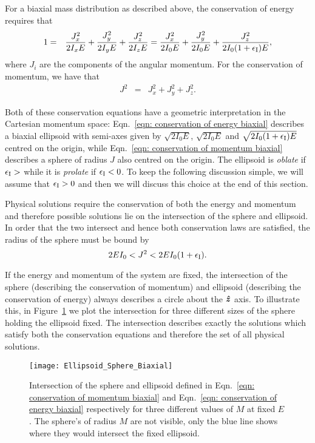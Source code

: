 \documentclass[../full_thesis/full_thesis.tex]{subfiles}
\begin{document}
For a biaxial mass distribution as described above, the conservation of energy
requires that
\begin{eqnarray}
1 & = & \frac{J_{x}^{2}}{2I_{x}E}+\frac{J_{y}^{2}}{2I_{y}E}+\frac{J_{z}^{2}}{2I_{z}E}
=\frac{J_{x}^{2}}{2I_{0}E}+\frac{J_{y}^{2}}{2I_{0}E}+\frac{J_{z}^{2}}{2I_{0}(1+\epsilon_{\mathrm{I}})E},
\label{eqn: conservation of energy biaxial}
\end{eqnarray}
where $J_i$ are the components of the angular momentum. For the conservation of
momentum, we have that
\begin{eqnarray}
J^{2} & = & J_{x}^{2}+J_{y}^{2}+J_{z}^{2}.
\label{eqn: conservation of momentum biaxial}
\end{eqnarray}

Both of these conservation equations have a geometric interpretation in the
Cartesian momentum space: Eqn.~\eqref{eqn: conservation of energy biaxial}
describes a biaxial ellipsoid with semi-axes given by $\sqrt{2I_{0}E}$,
$\sqrt{2I_{0}E}$ and $\sqrt{2I_{0}(1+\epsilon_{\mathrm{I}})E}$ centred on the origin,
while Eqn.~\eqref{eqn: conservation of momentum biaxial} describes a sphere of
radius $J$ also centred on the origin. The ellipsoid is \emph{oblate} if $\epsilon_{\mathrm{I}}
> $ while it is \emph{prolate} if $\epsilon_{\mathrm{I}} < 0$. To keep the following discussion
simple, we will assume that $\epsilon_{\mathrm{I}} > 0$ and then we will discuss this choice at
the end of this section.

Physical solutions require the conservation of both
the energy and momentum and therefore possible solutions lie on the intersection
of the sphere and ellipsoid. In order that the two intersect and hence both
conservation laws are satisfied, the radius of the sphere must be bound by
\begin{equation}
2EI_{0}<J^{2}<2EI_{0}(1+\epsilon_{\mathrm{I}}).
\label{eqn: orderings}
\end{equation}

If the energy and momentum of the system are fixed, the intersection of the
sphere (describing the conservation of momentum) and ellipsoid (describing the
conservation of energy) always describes a circle about the $\boldsymbol{\hat{z}}$ axis. To illustrate
this, in Figure~\ref{fig: plot sphere ellipse biaxial} we plot the intersection
for three different sizes of the sphere holding the ellipsoid fixed. The
intersection describes exactly the solutions which satisfy both the conservation
equations and therefore the set of all physical solutions.
\begin{figure}[ht]
\centering
\texttt{[image: Ellipsoid\_Sphere\_Biaxial]}
\caption{Intersection of the sphere and ellipsoid defined in Eqn.~\eqref{eqn:
conservation of momentum biaxial} and Eqn.~\eqref{eqn: conservation of energy
biaxial} respectively for three different values of $M$ at
fixed $E$. The sphere's of radius $M$ are not visible, only the blue line shows
where they would intersect the fixed ellipsoid.}
\label{fig: plot sphere ellipse biaxial}
\end{figure}
\end{document}
